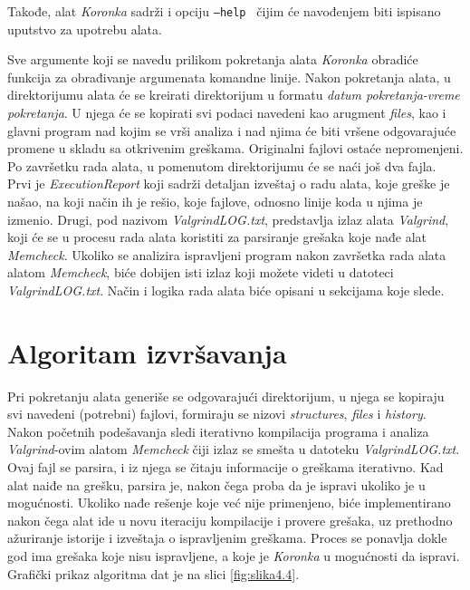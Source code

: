 \documentclass[12pt,oneside]{memoir}
\theoremstyle{plain}
\theoremstyle{definition}
\begin{document}
Takođe, alat \textit{Koronka} sadrži i opciju \texttt{--help } čijim će navođenjem biti ispisano uputstvo za upotrebu alata. 

Sve argumente koji se navedu prilikom pokretanja alata \textit{Koronka} obradiće funkcija za obrađivanje argumenata komandne linije. Nakon pokretanja alata, u direktorijumu alata će se kreirati direktorijum u formatu \textit{datum pokretanja-vreme pokretanja}. U njega će se kopirati svi podaci navedeni kao arugment \textit{files}, kao i glavni program nad kojim se vrši analiza i nad njima će biti vršene odgovarajuće promene u skladu sa otkrivenim greškama. Originalni fajlovi ostaće nepromenjeni. Po završetku rada alata, u pomenutom direktorijumu će se naći još dva fajla. Prvi je \textit{ExecutionReport} koji sadrži detaljan izveštaj o radu alata, koje greške je našao, na koji način ih je rešio, koje fajlove, odnosno linije koda u njima je izmenio. Drugi, pod nazivom \textit{ValgrindLOG.txt}, predstavlja izlaz alata \textit{Valgrind}, koji će se u procesu rada alata koristiti za parsiranje grešaka koje nađe alat \textit{Memcheck}. Ukoliko se analizira ispravljeni program nakon završetka rada alata alatom \textit{Memcheck}, biće dobijen isti izlaz koji možete videti u datoteci \textit{ValgrindLOG.txt}. Način i logika rada alata biće opisani u sekcijama koje slede.

\section{Algoritam izvršavanja}\label{algoritam}
Pri pokretanju alata generiše se odgovarajući direktorijum, u njega se kopiraju svi navedeni (potrebni) fajlovi, formiraju se nizovi \textit{structures}, \textit{files} i \textit{history}. Nakon početnih podešavanja sledi iterativno kompilacija programa i analiza \textit{Valgrind}-ovim alatom \textit{Memcheck} čiji izlaz se smešta u datoteku \textit{ValgrindLOG.txt}. Ovaj fajl se parsira, i iz njega se čitaju informacije o greškama iterativno. Kad alat naiđe na grešku, parsira je, nakon čega proba da je ispravi ukoliko je u mogućnosti. Ukoliko nađe rešenje koje već nije primenjeno, biće implementirano nakon čega alat ide u novu iteraciju kompilacije i provere grešaka, uz prethodno ažuriranje istorije i izveštaja o ispravljenim greškama. Proces se ponavlja dokle god ima grešaka koje nisu ispravljene, a koje je \textit{Koronka} u mogućnosti da ispravi. Grafički prikaz algoritma dat je na slici \ref{fig:slika4.4}.
\end{document}
